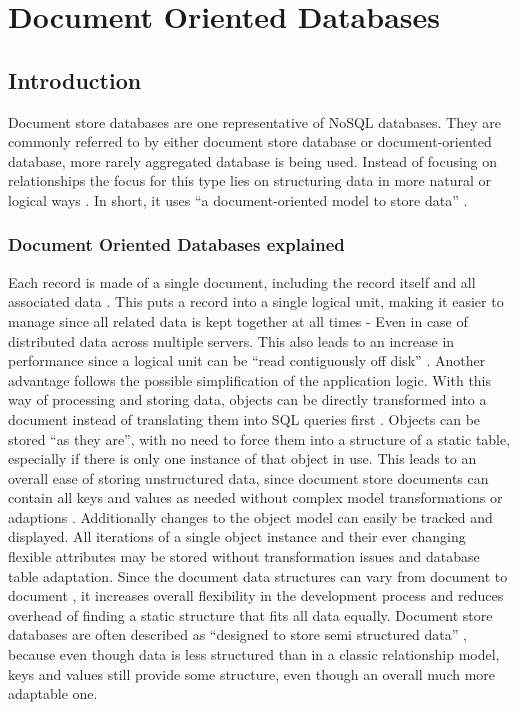 \chapter{Document Oriented Databases}
\section{Introduction}
Document store databases are one representative of NoSQL databases. They are commonly referred to by either document store database or document-oriented database, more rarely aggregated database is being used. Instead of focusing on relationships the focus for this type lies on structuring data in more natural or logical ways \parencite{mongodb2019}. In short, it uses “a document-oriented model to store data” \parencite{ian2016}. 

\subsection{Document Oriented Databases explained}
Each record is made of a single document, including the record itself and all associated data \parencite{ian2016}\parencite{amazonNoSql}. This puts a record into a single logical unit, making it easier to manage since all related data is kept together at all times - Even in case of distributed data across multiple servers. This also leads to an increase in performance since a logical unit can be “read contiguously off disk” \parencite{mongodb2019}. Another advantage follows the possible simplification of the application logic. With this way of processing and storing data, objects can be directly transformed into a document instead of translating them into SQL queries first \parencite{mongodb2019}  \parencite{amazonNoSql}. Objects can be stored \enquote{as they are}, with no need to force them into a structure of a static table, especially if there is only one instance of that object in use. This leads to an overall ease of storing unstructured data, since document store documents can contain all keys and values as needed without complex model transformations or adaptions \parencite{mongodb2019}. Additionally changes to the object model can easily be tracked and displayed. All iterations of a single object instance and their ever changing flexible attributes may be stored without transformation issues and database table adaptation. Since the document data structures can vary from document to document  \parencite{amazonNoSql}, it increases overall flexibility in the development process and reduces overhead of finding a static structure that fits all data equally. Document store databases are often described as “designed to store semi structured data”  \parencite{amazonNoSql}, because even though data is less structured than in a classic relationship model, keys and values still provide some structure, even though an overall much more adaptable one.


